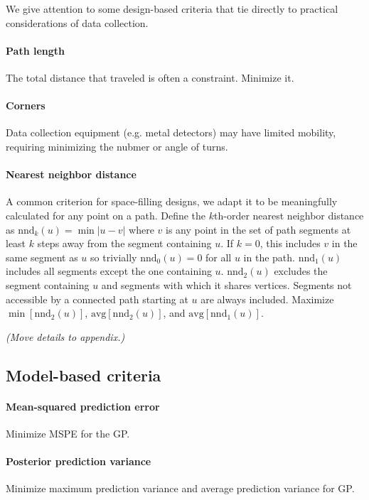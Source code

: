\documentclass[review]{elsarticle}
\begin{document}
We give attention to some design-based criteria that tie directly to practical
considerations of data collection.

\paragraph{Path length}
The total distance that traveled is often a constraint. Minimize it.

\paragraph{Corners}
Data collection equipment (e.g. metal detectors) may have limited mobility,
requiring minimizing the nubmer or angle of turns.

\paragraph{Nearest neighbor distance}
A common criterion for space-filling designs, we adapt it to be meaningfully
calculated for any point on a path. Define the \(k\)th-order nearest neighbor
distance as \(\mathrm{nnd}_{k}(u) = \min|u - v|\) where \(v\) is any point
in the set of path segments at least \(k\) steps away from the segment
containing \(u\). If \(k = 0\), this includes \(v\) in the same segment as
\(u\) so trivially \(\mathrm{nnd}_{0}(u) = 0\) for all \(u\) in the path.
\(\mathrm{nnd}_{1}(u)\) includes all segments except the one containing \(u\).
\(\mathrm{nnd}_{2}(u)\) excludes the segment containing \(u\) and segments with
which it shares vertices. Segments not accessible by a connected path starting
at \(u\) are always included. Maximize \(\min[\mathrm{nnd}_{2}(u)]\),
\(\mathrm{avg}[\mathrm{nnd}_{2}(u)]\), and
\(\mathrm{avg}[\mathrm{nnd}_{1}(u)]\).

{\it (Move details to appendix.)}


\subsection{Model-based criteria}

\paragraph{Mean-squared prediction error}
Minimize MSPE for the GP.

\paragraph{Posterior prediction variance}
Minimize maximum prediction variance and average prediction variance for GP.
\end{document}
